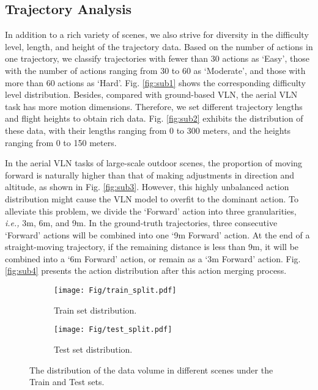 \subsection{Trajectory Analysis}

In addition to a rich variety of scenes, we also strive for diversity in the difficulty level, length, and height of the trajectory data. Based on the number of actions in one trajectory, we classify trajectories with fewer than 30 actions as `Easy', those with the number of actions ranging from 30 to 60 as `Moderate', and those with more than 60 actions as `Hard'. Fig. \ref{fig:sub1} shows the corresponding difficulty level distribution. Besides, compared with ground-based VLN, the aerial VLN task has more motion dimensions. Therefore, we set different trajectory lengths and flight heights to obtain rich data. Fig. \ref{fig:sub2} exhibits the distribution of these data, with their lengths ranging from 0 to 300 meters, and the heights ranging from 0 to 150 meters. 

In the aerial VLN tasks of large-scale outdoor scenes, the proportion of moving forward is naturally higher than that of making adjustments in direction and altitude, as shown in Fig. \ref{fig:sub3}. However, this highly unbalanced action distribution might cause the VLN model to overfit to the dominant action. To alleviate this problem, we divide the `Forward' action into three granularities, \emph{i.e.,} 3m, 6m, and 9m. In the ground-truth trajectories, three consecutive `Forward' actions will be combined into one `9m Forward' action. At the end of a straight-moving trajectory, if the remaining distance is less than 9m, it will be combined into a `6m Forward' action, or remain as a `3m Forward' action. Fig. \ref{fig:sub4} presents the action distribution after this action merging process.



\begin{figure}
    \centering
    \begin{subfigure}[b]{0.47\columnwidth}
        \centering
        \texttt{[image: Fig/train\_split.pdf]}
        \caption{Train set distribution.}
        \label{fig:train_sp}
    \end{subfigure}
    \hfill
    \begin{subfigure}[b]{0.47\columnwidth}
        \centering
        \texttt{[image: Fig/test\_split.pdf]}
        \caption{Test set distribution.}
        \label{fig:test_sp}
    \end{subfigure}
    \caption{The distribution of the data volume in different scenes under the Train and Test sets.}
    \label{fig:traj_sta}
\end{figure}


